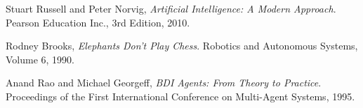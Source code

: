\documentclass[a4paper,10pt]{article}
\begin{document}
\begin{thebibliography}{9}
    Stuart Russell and Peter Norvig,
    \emph{Artificial Intelligence: A Modern Approach}. \newline
    Pearson Education Inc.,
    3rd Edition,
    2010.

    Rodney Brooks,
    \emph{Elephants Don't Play Chess}. \newline
    Robotics and Autonomous Systems,
    Volume 6,
    1990.

    Anand Rao and Michael Georgeff,
    \emph{BDI Agents: From Theory to Practice}. \newline
    Proceedings of the First International Conference on Multi-Agent Systems,
    1995.
\end{thebibliography}
\end{document}
